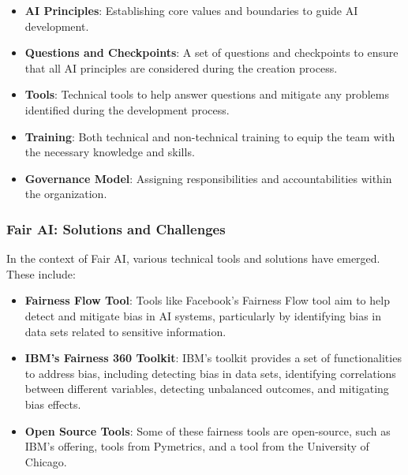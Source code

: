 \documentclass{article}
\begin{document}
\begin{itemize}

    \item \textbf{AI Principles}: Establishing core values and boundaries to guide AI development.

    \item \textbf{Questions and Checkpoints}: A set of questions and checkpoints to ensure that all AI principles are considered during the creation process.

    \item \textbf{Tools}: Technical tools to help answer questions and mitigate any problems identified during the development process.

    \item \textbf{Training}: Both technical and non-technical training to equip the team with the necessary knowledge and skills.

    \item \textbf{Governance Model}: Assigning responsibilities and accountabilities within the organization.

\end{itemize}

\subsubsection{Fair AI: Solutions and Challenges}

In the context of Fair AI, various technical tools and solutions have emerged. These include:

\begin{itemize}

    \item \textbf{Fairness Flow Tool}: Tools like Facebook's Fairness Flow tool aim to help detect and mitigate bias in AI systems, particularly by identifying bias in data sets related to sensitive information.

    \item \textbf{IBM's Fairness 360 Toolkit}: IBM's toolkit provides a set of functionalities to address bias, including detecting bias in data sets, identifying correlations between different variables, detecting unbalanced outcomes, and mitigating bias effects.

    \item \textbf{Open Source Tools}: Some of these fairness tools are open-source, such as IBM's offering, tools from Pymetrics, and a tool from the University of Chicago.

\end{itemize}
\end{document}

